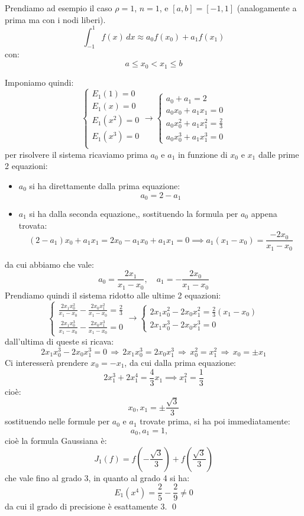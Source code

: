 \documentclass[a4paper,11pt]{article}
\begin{document}
Prendiamo ad esempio il caso $\rho = 1$, $n = 1$, e $[a, b] = [-1, 1]$ (analogamente a prima ma con i nodi liberi).
$$
\int_{-1}^1 f(x) \, dx \approx a_0 f(x_0) + a_1 f(x_1)
$$
con:
$$
a \leq x_0 < x_1 \leq b
$$

Imponiamo quindi:
\[
	\begin{cases}
		E_1(1) = 0 \\	
		E_1(x) = 0 \\	
		E_1(x^2) = 0 \\	
		E_1(x^3) = 0 \\	
	\end{cases}
	\rightarrow
	\begin{cases}
		a_0 + a_1 = 2 \\
		a_0 x_0 + a_1 x_1 = 0 \\
		a_0 x_0^2 + a_1 x_1^2 = \frac{2}{3} \\
		a_0 x_0^3 + a_1 x_1^3 = 0
	\end{cases}
\]
per risolvere il sistema ricaviamo prima $a_0$ e $a_1$ in funzione di $x_0$ e $x_1$ dalle prime 2 equazioni:
\begin{itemize}
	\item $a_0$ si ha direttamente dalla prima equazione:
		$$
			a_0 = 2 - a_1
		$$
	\item $a_1$ si ha dalla seconda equazione,, sostituendo la formula per $a_0$ appena trovata:
		$$
		(2 - a_1) x_0 + a_1 x_1 = 2x_0 - a_1 x_0 + a_1 x_1 = 0 \implies a_1 (x_1 - x_0) = \frac{-2 x_0}{x_1 - x_0}
		$$
\end{itemize}
da cui abbiamo che vale:
$$
a_0 = \frac{2 x_1}{x_1 - x_0}, \quad a_1 = -\frac{2 x_0}{x_1 - x_0}
$$
Prendiamo quindi il sistema ridotto alle ultime 2 equazioni:
\[
	\begin{cases}
		\frac{2 x_1 x_0^2}{x_1 - x_0} - \frac{2 x_0 x_1^2}{x_1 - x_0} = \frac{2}{3} \\ 
		\frac{2 x_1 x_0^3}{x_1 - x_0} - \frac{2 x_0 x_1^3}{x_1 - x_0} = 0
	\end{cases}
	\rightarrow 
	\begin{cases}
		2 x_1 x_0^2 - 2 x_0 x_1^2 = \frac{2}{3} (x_1 - x_0) \\ 
		2 x_1 x_0^3 - 2 x_0 x_1^3 = 0
	\end{cases}
\]
dall'ultima di queste si ricava:
$$
2 x_1 x_0^3 - 2 x_0 x_1^3 = 0 \, \Rightarrow \, 2 x_1 x_0^3 = 2 x_0 x_1^3 \, \Rightarrow \, x_0^2 = x_1^2 \, \Rightarrow \, x_0 = \pm x_1
$$
Ci interesserà prendere $x_0 = - x_1$, da cui dalla prima equazione:
$$
2 x_1^3 + 2 x_1^4 = \frac{4}{3} x_1 \implies x_1^2 = \frac{1}{3}
$$
cioè:
$$
x_0, x_1 = \pm \frac{\sqrt{3}}{3}
$$
sostituendo nelle formule per $a_0$ e $a_1$ trovate prima, si ha poi immediatamente:
$$
a_0, a_1 = 1, \quad 
$$
cioè la formula Gaussiana è:
$$
J_1(f) = f\left(-\frac{\sqrt{3}}{3}\right) + f\left(\frac{\sqrt{3}}{3}\right)
$$
che vale fino al grado 3, in quanto al grado 4 si ha:
$$
E_1(x^4) = \frac{2}{5} - \frac{2}{9} \neq 0
$$
da cui il grado di precisione è esattamente 3. \qed
\end{document}
